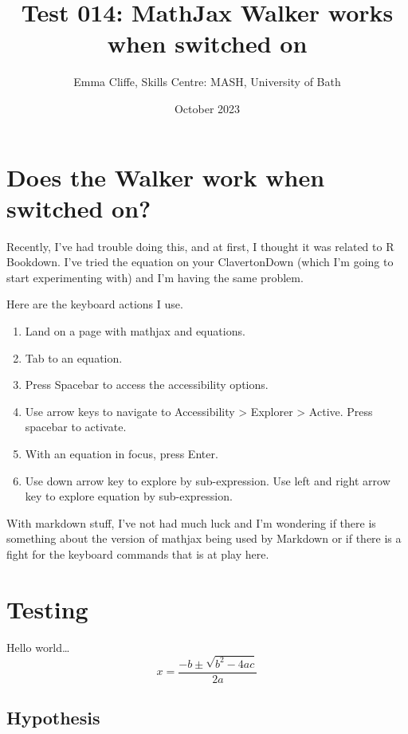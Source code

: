 \documentclass[
  12pt,
  a4paper]{extarticle}
\title{Test 014: MathJax Walker works when switched on}
\author{Emma Cliffe, Skills Centre: MASH, University of Bath}
\date{October 2023}
\providecommand{\tightlist}{%
  \setlength{\itemsep}{0pt}\setlength{\parskip}{0pt}}
\renewcommand{\;}{\,}
\begin{document}
\maketitle

\hypertarget{does-the-walker-work-when-switched-on}{%
\section{Does the Walker work when switched on?}\label{does-the-walker-work-when-switched-on}}

Recently, I've had trouble doing this, and at first, I thought it was related to R Bookdown. I've tried the equation on your ClavertonDown (which I'm going to start experimenting with) and I'm having the same problem.

Here are the keyboard actions I use.

\begin{enumerate}
\def\labelenumi{\arabic{enumi}.}
\tightlist
\item
  Land on a page with mathjax and equations.
\item
  Tab to an equation.
\item
  Press Spacebar to access the accessibility options.
\item
  Use arrow keys to navigate to Accessibility \textgreater{} Explorer \textgreater{} Active. Press spacebar to activate.
\item
  With an equation in focus, press Enter.
\item
  Use down arrow key to explore by sub-expression. Use left and right arrow key to explore equation by sub-expression.
\end{enumerate}

With markdown stuff, I've not had much luck and I'm wondering if there is something about the version of mathjax being used by Markdown or if there is a fight for the keyboard commands that is at play here.

\hypertarget{testing}{%
\section{Testing}\label{testing}}

Hello world\ldots{}
\[x = \frac{-b \pm \sqrt{b^2 - 4ac}}{2a}\]

\hypertarget{hypothesis}{%
\subsection{Hypothesis}\label{hypothesis}}
\end{document}
